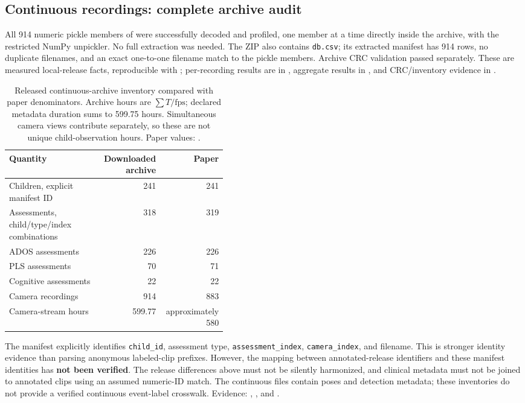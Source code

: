 \subsection{Continuous recordings: complete archive audit}
\label{sec:continuous-audit}
All 914 numeric pickle members of  were
successfully decoded and profiled, one member at a time directly inside
the archive, with the restricted NumPy unpickler. No full extraction was
needed. The ZIP also contains \texttt{db.csv}; its extracted manifest has
914 rows, no duplicate filenames, and an exact one-to-one filename match
to the pickle members. Archive CRC validation passed separately.
These are measured local-release facts, reproducible with
; per-recording results are in
, aggregate results in
, and CRC/inventory
evidence in .

\begin{table}[htbp]
\centering\small
\begin{tabular}{P{0.42\linewidth}rr}
\toprule
Quantity & Downloaded archive & Paper \\
\midrule
Children, explicit manifest ID & 241 & 241 \\
Assessments, child/type/index combinations & 318 & 319 \\
ADOS assessments & 226 & 226 \\
PLS assessments & 70 & 71 \\
Cognitive assessments & 22 & 22 \\
Camera recordings & 914 & 883 \\
Camera-stream hours & 599.77 & approximately 580 \\
\bottomrule
\end{tabular}
\caption{Released continuous-archive inventory compared with paper
denominators. Archive hours are $\sum T/\mathrm{fps}$; declared metadata
duration sums to 599.75 hours. Simultaneous camera views contribute
separately, so these are not unique child-observation hours.
Paper values: \cite[pp.~3--4]{barami2024}.}
\end{table}

The manifest explicitly identifies \texttt{child\_id}, assessment type,
\texttt{assessment\_index}, \texttt{camera\_index}, and filename.
This is stronger identity evidence than parsing anonymous labeled-clip
prefixes. However, the mapping between annotated-release identifiers and
these manifest identities has \textbf{not been verified}. The release
differences above must not be silently harmonized, and clinical metadata
must not be joined to annotated clips using an assumed numeric-ID match.
The continuous files contain poses and detection metadata; these
inventories do not provide a verified continuous event-label crosswalk.
Evidence: ,
, and
.

